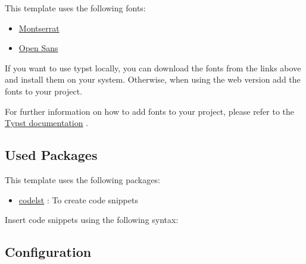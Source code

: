 This template uses the following fonts:

\begin{itemize}
\tightlist
\item
  \href{https://fonts.google.com/specimen/Montserrat}{Montserrat}
\item
  \href{https://fonts.google.com/specimen/Open+Sans}{Open Sans}
\end{itemize}

If you want to use typst locally, you can download the fonts from the
links above and install them on your system. Otherwise, when using the
web version add the fonts to your project.

For further information on how to add fonts to your project, please
refer to the
\href{https://typst.app/docs/reference/text/text/\#parameters-font}{Typst
documentation} .

\subsection{Used Packages}\label{used-packages}

This template uses the following packages:

\begin{itemize}
\tightlist
\item
  \href{https://typst.app/universe/package/codelst}{codelst} : To create
  code snippets
\end{itemize}

Insert code snippets using the following syntax:

\begin{Shaded}
\begin{Highlighting}[]
\NormalTok{\#figure(caption: "Codeblock Example", sourcecode[\textasciigrave{}\textasciigrave{}\textasciigrave{}ts}
\NormalTok{  );}
\NormalTok{\};}

\NormalTok{\textasciigrave{}\textasciigrave{}\textasciigrave{}])}
\end{Highlighting}
\end{Shaded}

\subsection{Configuration}\label{configuration}


